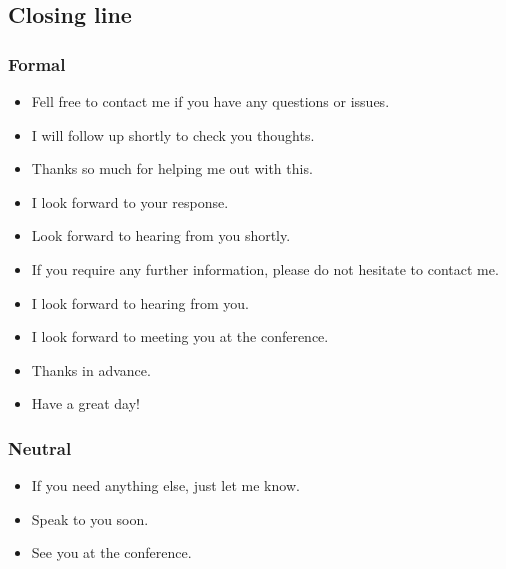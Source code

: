\subsection{Closing line}

\subsubsection{Formal}
\begin{itemize}
\item Fell free to contact me if you have any questions or issues.
\item I will follow up shortly to check you thoughts.
\item Thanks so much for helping me out with this.
\item I look forward to your response.
\item Look forward to hearing from you shortly.
\item If you require any further information, please do not hesitate to contact me.
\item I look forward to hearing from you.
\item I look forward to meeting you at the conference.
\item Thanks in advance.
\item Have a great day!
\end{itemize}

\subsubsection{Neutral}
\begin{itemize}
\item If you need anything else, just let me know.
\item Speak to you soon.
\item See you at the conference.
\end{itemize}